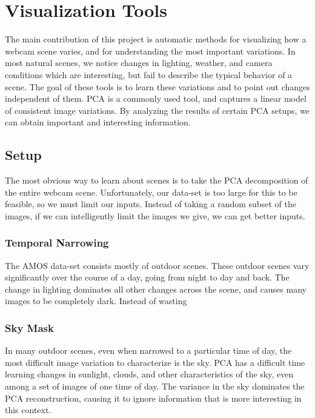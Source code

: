 \chapter{Visualization Tools}
\label{cpt:tools}

The main contribution of this project is automatic methods for visualizing how a webcam
scene varies, and for understanding the most important variations.  In most natural
scenes, we notice changes in lighting, weather, and camera conditions which are interesting,
but fail to describe the typical behavior of a scene.  The goal of these tools is to learn 
these variations and to point out changes independent of them.  PCA is a commonly used tool, and
captures a linear model of consistent image variations.  By analyzing the results of certain PCA setups, we can obtain important and interesting information.

\section{Setup}

The most obvious way to learn about scenes is to take the PCA decomposition of the entire webcam scene.  Unfortunately, our data-set is too large for this to be feasible, so we must limit our inputs.  Instead of taking a random subset of the images, if we can intelligently limit the images we give, we can get better inputs.

\subsection{Temporal Narrowing}

The AMOS data-set consists mostly of outdoor scenes.  These outdoor scenes vary significantly over the course of a day, going from night to day and back.  The change in lighting dominates all other changes across the scene, and causes many images to be completely dark.  Instead of wasting 

\subsection{Sky Mask}
In many outdoor scenes, even when narrowed to a particular time of day, the most difficult image
variation to characterize is the sky.  PCA has a difficult time learning changes in sunlight, clouds,
and other characteristics of the sky, even among a set of images of one time of day.  The variance in the sky dominates the PCA reconstruction, causing it to ignore information that is more interesting in this context.

